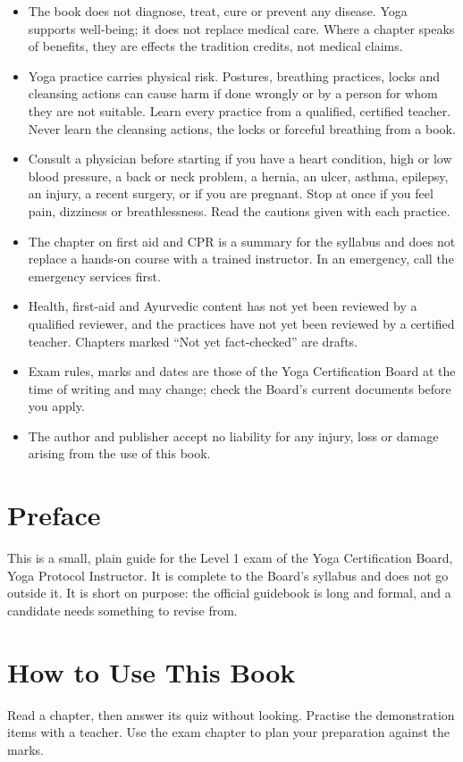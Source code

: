 \begin{itemize}
\item The book does not diagnose, treat, cure or prevent any disease. Yoga supports well-being; it does not replace medical care. Where a chapter speaks of benefits, they are effects the tradition credits, not medical claims.
\item Yoga practice carries physical risk. Postures, breathing practices, locks and cleansing actions can cause harm if done wrongly or by a person for whom they are not suitable. Learn every practice from a qualified, certified teacher. Never learn the cleansing actions, the locks or forceful breathing from a book.
\item Consult a physician before starting if you have a heart condition, high or low blood pressure, a back or neck problem, a hernia, an ulcer, asthma, epilepsy, an injury, a recent surgery, or if you are pregnant. Stop at once if you feel pain, dizziness or breathlessness. Read the cautions given with each practice.
\item The chapter on first aid and CPR is a summary for the syllabus and does not replace a hands-on course with a trained instructor. In an emergency, call the emergency services first.
\item Health, first-aid and Ayurvedic content has not yet been reviewed by a qualified reviewer, and the practices have not yet been reviewed by a certified teacher. Chapters marked ``Not yet fact-checked'' are drafts.
\item Exam rules, marks and dates are those of the Yoga Certification Board at the time of writing and may change; check the Board's current documents before you apply.
\item The author and publisher accept no liability for any injury, loss or damage arising from the use of this book.
\end{itemize}
\clearpage

\chapter*{Preface}

This is a small, plain guide for the Level 1 exam of the Yoga Certification Board, Yoga Protocol Instructor.
It is complete to the Board's syllabus and does not go outside it. It is short on purpose: the official
guidebook is long and formal, and a candidate needs something to revise from.

\chapter*{How to Use This Book}

Read a chapter, then answer its quiz without looking. Practise the demonstration items with a teacher. Use
the exam chapter to plan your preparation against the marks.

